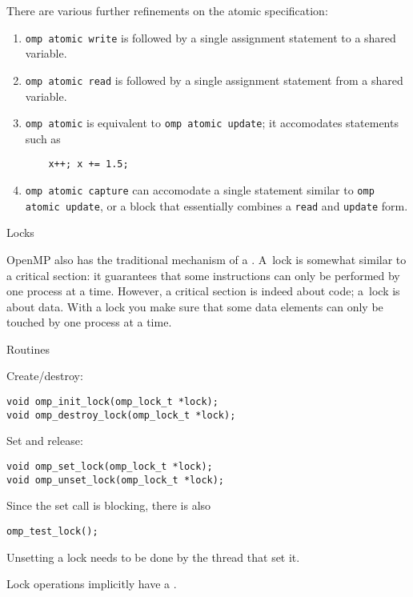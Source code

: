 There are various further refinements on the atomic specification:
\begin{enumerate}
\item \lstinline{omp atomic write} is followed by  a single assignment statement
  to a shared variable.
\item \lstinline{omp atomic read} is followed by  a single assignment statement
  from a shared variable.
\item \lstinline{omp atomic} is equivalent to \lstinline{omp atomic update};
  it accomodates statements such as 
  \begin{lstlisting}
    x++; x += 1.5;
  \end{lstlisting}
\item \lstinline{omp atomic capture} can accomodate a single statement
  similar to \lstinline{omp atomic update},
  or a block that essentially combines a \lstinline{read} and \lstinline{update} form.
\end{enumerate}


 {Locks}
\label{sec:ompref:locks}

OpenMP also has the traditional mechanism of a . A~lock is somewhat similar to 
a critical section: it guarantees that some instructions can only be performed by one
process at a time. However, a critical section is indeed about code; a~lock is about data.
With a lock you make sure that some data elements can only be touched by one process at a time.

 {Routines}

Create/destroy:
\begin{lstlisting}
void omp_init_lock(omp_lock_t *lock);
void omp_destroy_lock(omp_lock_t *lock);
\end{lstlisting}
Set and release:
\begin{lstlisting}
void omp_set_lock(omp_lock_t *lock);
void omp_unset_lock(omp_lock_t *lock);
\end{lstlisting}
Since the set call is blocking, there is also 
\begin{lstlisting}
omp_test_lock();
\end{lstlisting}

Unsetting a lock needs to be done by the thread that set it.

Lock operations implicitly have a .


